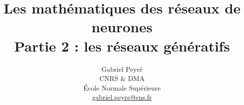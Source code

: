 \documentclass[11pt]{article}
\title{Les mathématiques des réseaux de neurones\\Partie 2 : les réseaux génératifs}
\author{%
\begin{tabular}{c}
	Gabriel Peyr{\'e} \\ CNRS \& DMA \\
	 \'Ecole Normale Sup\'erieure \\
	 \url{gabriel.peyre@ens.fr}
\end{tabular}
}
\date{}
\begin{document}
\maketitle

\begin{abstract}

\end{abstract}





\end{document}

